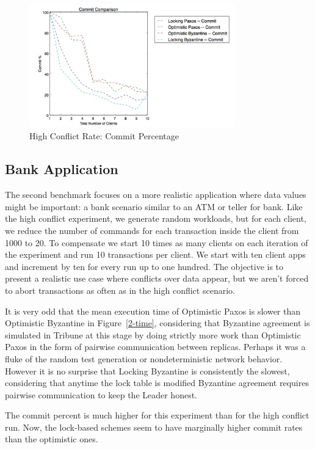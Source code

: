 \documentclass[10pt,twocolumn]{article}
\begin{document}
\begin{figure}[!b]
  \begin{center}
    \includegraphics[width=3.5in]{Images/1-commit.png}
  \end{center}

  \caption{\small High Conflict Rate: Commit Percentage }
  \label{1-commit}
\end{figure}

\subsection{Bank Application}

The second benchmark focuses on a more realistic application where data values might be important: a bank scenario similar to an ATM or teller for bank. Like the high conflict experiment, we generate random workloads, but for each client, we reduce the number of commands for each transaction inside the client from 1000 to 20. To compensate we start 10 times as many clients on each iteration of the experiment and run 10 transactions per client. We start with ten client apps and increment by ten for every run up to one hundred. The objective is to present a realistic use case where conflicts over data appear, but we aren't forced to abort transactions as often as in the high conflict scenario.

It is very odd that the mean execution time of Optimistic Paxos is slower than Optimistic Byzantine in Figure~\ref{2-time}, considering that Byzantine agreement is simulated in Tribune at this stage by doing strictly more work than Optimistic Paxos in the form of pairwise communication between replicas. Perhaps it was a fluke of the random test generation or nondeterministic network behavior. However it is no surprise that Locking Byzantine is consistently the slowest, considering that anytime the lock table is modified Byzantine agreement requires pairwise communication to keep the Leader honest.

The commit percent is much higher for this experiment than for the high conflict run. Now, the lock-based schemes seem to have marginally higher commit rates than the optimistic ones.
\end{document}
